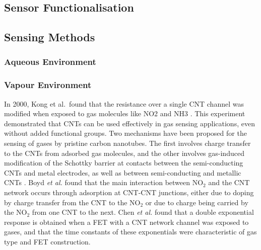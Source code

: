 \documentclass[
  a4paper,
]{scrbook}
\begin{document}
\newpage
{}

\hypertarget{sensor-functionalisation}{%
\subsection{Sensor Functionalisation}\label{sensor-functionalisation}}

\hypertarget{sec-biosensor-methods}{%
\subsection{Sensing Methods}\label{sec-biosensor-methods}}

\hypertarget{aqueous-environment}{%
\subsubsection*{Aqueous Environment}\label{aqueous-environment}}

\hypertarget{vapour-environment}{%
\subsubsection*{Vapour Environment}\label{vapour-environment}}

In 2000, Kong et al.~found that the resistance over a single CNT channel
was modified when exposed to gas molecules like NO2 and NH3
\autocite{Kong2000}. This experiment demonstrated that CNTs can be used
effectively in gas sensing applications, even without added functional
groups. Two mechanisms have been proposed for the sensing of gases by
pristine carbon nanotubes. The first involves charge transfer to the
CNTs from adsorbed gas molecules, and the other involves gas-induced
modification of the Schottky barrier at contacts between the
semi-conducting CNTs and metal electrodes, as well as between
semi-conducting and metallic CNTs \autocite{Battie2011,Boyd2014}. Boyd
\emph{et al.} found that the main interaction between NO\(_2\) and the
CNT network occurs through adsorption at CNT-CNT junctions, either due
to doping by charge transfer from the CNT to the NO\(_2\) or due to
charge being carried by the NO\(_2\) from one CNT to the next. Chen
\emph{et al.} \autocite{Chen2019} found that a double exponential
response is obtained when a FET with a CNT network channel was exposed
to gases, and that the time constants of these exponentials were
characteristic of gas type and FET construction.
\end{document}
